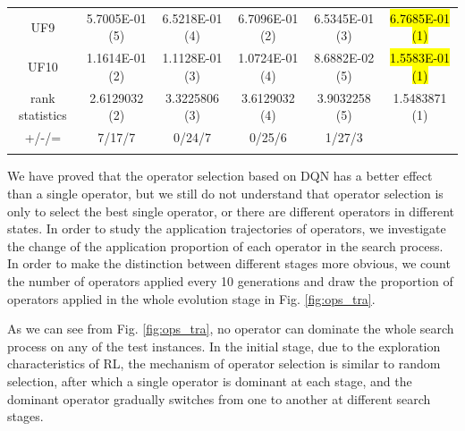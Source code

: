 \documentclass[journal]{IEEEtran}
\begin{document}
\begin{table}[tbp]
\begin{tabular}{cccccc}
    UF9             & 5.7005E-01 (5)      & 6.5218E-01 (4)      & 6.7096E-01 (2)    & 6.5345E-01 (3)      & \hl{6.7685E-01 (1)} \\
    UF10            & 1.1614E-01 (2)      & 1.1128E-01 (3)      & 1.0724E-01 (4)    & 8.6882E-02 (5)      & \hl{1.5583E-01 (1)} \\
    \hline
    rank statistics & 2.6129032 (2)       & 3.3225806 (3)       & 3.6129032 (4)     & 3.9032258 (5)       & 1.5483871 (1)       \\
    \hline
    +/-/=           & 7/17/7              & 0/24/7              & 0/25/6            & 1/27/3              &                     \\
    \bottomrule
    \label{tab:hv_ops}
  \end{tabular}
\end{table}

We have proved that the operator selection based on DQN has a better effect than a single operator, but we still do not understand that operator selection is only to select the best single operator, or there are different operators in different states. In order to study the application trajectories of operators, we investigate the change of the application proportion of each operator in the search process.
In order to make the distinction between different stages more obvious, we count the number of operators applied every 10 generations and draw the proportion of operators applied in the whole evolution stage in Fig. \ref{fig:ops_tra}.

As we can see from Fig. \ref{fig:ops_tra}, no operator can dominate the whole search process on any of the test instances. In the initial stage, due to the exploration characteristics of RL, the mechanism of operator selection is similar to random selection, after which a single operator is dominant at each stage, and the dominant operator gradually switches from one to another at different search stages.
\end{document}
